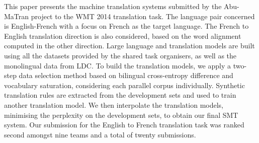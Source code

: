 This paper presents the machine translation systems submitted by the Abu-MaTran project to the WMT 2014 translation task. The language pair concerned is English-French with a focus on French as the target language. The French to English translation direction is also considered, based on the word alignment computed in the other direction. Large language and translation models are built using all the datasets provided by the shared task organisers, as well as the monolingual data from LDC. To build the translation models, we apply a two-step data selection method based on bilingual cross-entropy difference and vocabulary saturation, considering each parallel corpus individually. Synthetic translation rules are extracted from the development sets and used to train another translation model. We then interpolate the translation models, minimising the perplexity on the development sets, to obtain our final SMT system. Our submission for the English to French translation task was ranked second amongst nine teams and a total of twenty submissions.
